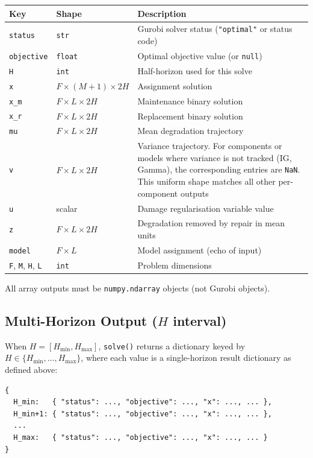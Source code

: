 \documentclass[11pt,a4paper]{article}
\begin{document}
\begin{longtable}{@{}llp{7cm}@{}}
\toprule
Key & Shape & Description \\
\midrule
\texttt{status} & \texttt{str} & Gurobi solver status (\texttt{"optimal"} or status code) \\
\texttt{objective} & \texttt{float} & Optimal objective value (or \texttt{null}) \\
\texttt{H} & \texttt{int} & Half-horizon used for this solve \\
\texttt{x} & $F \times (M{+}1) \times 2H$ & Assignment solution \\
\texttt{x\_m} & $F \times L \times 2H$ & Maintenance binary solution \\
\texttt{x\_r} & $F \times L \times 2H$ & Replacement binary solution \\
\texttt{mu} & $F \times L \times 2H$ & Mean degradation trajectory \\
\texttt{v} & $F \times L \times 2H$ & Variance trajectory. For components or models
  where variance is not tracked (IG, Gamma), the corresponding entries are
  \texttt{NaN}. This uniform shape matches all other per-component outputs \\
\texttt{u} & scalar & Damage regularisation variable value \\
\texttt{z} & $F \times L \times 2H$ & Degradation removed by repair in mean units \\
\texttt{model} & $F \times L$ & Model assignment (echo of input) \\
\texttt{F}, \texttt{M}, \texttt{H}, \texttt{L} & \texttt{int} & Problem dimensions \\
\bottomrule
\end{longtable}

All array outputs must be \texttt{numpy.ndarray} objects (not Gurobi objects).

\subsection{Multi-Horizon Output ($H$ interval)}

When $H = [H_{\min}, H_{\max}]$, \texttt{solve()} returns a dictionary keyed by
$H \in \{H_{\min},\ldots,H_{\max}\}$, where each value is a single-horizon result
dictionary as defined above:

\begin{lstlisting}
{
  H_min:   { "status": ..., "objective": ..., "x": ..., ... },
  H_min+1: { "status": ..., "objective": ..., "x": ..., ... },
  ...
  H_max:   { "status": ..., "objective": ..., "x": ..., ... }
}
\end{lstlisting}
\end{document}
